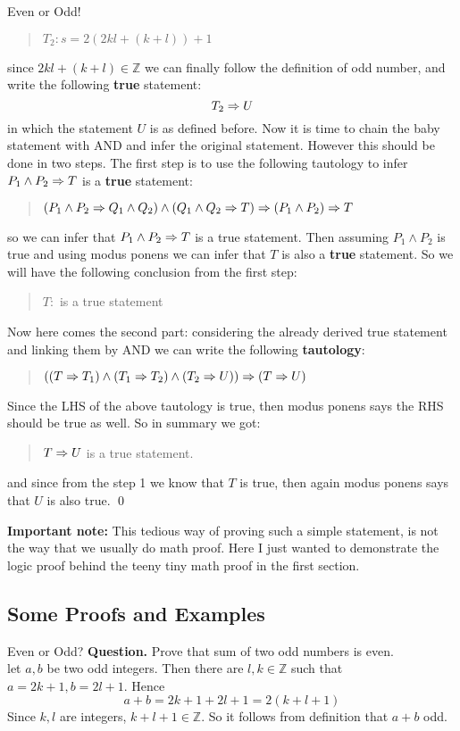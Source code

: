 \begin{example}{Even or Odd!}
\begin{quote}
		$ T_2: s =  2(2kl + (k+l)) + 1 $
	\end{quote}
	since $ 2kl + (k+l) \in \mathbb{Z} $ we can finally follow the definition of odd number, and write the following \textbf{true} statement:
	\[ T_2 \Rightarrow U \]
	in which the statement $ U $ is as defined before. Now it is time to chain the baby statement with AND and infer the original statement. However this should be done in two steps. The first step is to use the following tautology to infer $ P_1 \wedge P_2 \Rightarrow T $ is a \textbf{true} statement:
	\begin{quote}
		\centering
		$ (P_1 \wedge P_2 \Rightarrow Q_1 \wedge Q_2) \wedge (Q_1 \wedge Q_2 \Rightarrow T) \Rightarrow (P_1 \wedge P_2) \Rightarrow T $
	\end{quote}
	so we can infer that $ P_1 \wedge P_2 \Rightarrow T $ is a true statement. Then assuming $ P_1 \wedge P_2 $ is  true and using modus ponens we can infer that $ T $ is also a \textbf{true} statement. So we will have the following conclusion from the first step:
	\begin{quote}
		\centering
		$ T: $ is a true statement
	\end{quote}
	Now here comes the second part: considering the already derived true statement and linking them by AND we can write the following \textbf{tautology}:
	\begin{quote}
		\centering
		$ ((T \Rightarrow T_1) \wedge (T_1 \Rightarrow T_2) \wedge (T_2 \Rightarrow U)) \Rightarrow (T \Rightarrow U) $ 
	\end{quote}
	Since the LHS of the above tautology is true, then modus ponens says the RHS should be true as well. So in summary we got:
	\begin{quote}
		\centering
		$ T \Rightarrow U $ is a true statement.
	\end{quote}
	and since from the step 1 we know that $ T $ is true, then again modus ponens says that $ U $ is also true. \qed
	\newline
	
	\textbf{Important note:} This tedious way of proving such a simple statement, is not the way that we usually do math proof. Here I just wanted to demonstrate the logic proof behind the teeny tiny math proof in the first section.
\end{example}

\subsection{Some Proofs and Examples}


\begin{example}{Even or Odd?}
	\textbf{Question.} Prove that sum of two odd numbers is even. \\
	
	 let $ a,b $ be two odd integers. Then there are $ l,k \in \mathbb{Z} $ such that $ a = 2k+1, b = 2l+1 $. Hence \[ a+b = 2k+1+2l+1 = 2(k+l+1) \]
	Since $ k,l $ are integers, $ k+l+1 \in \mathbb{Z} $. So it follows from definition that $ a+b $ odd.
\end{example}

